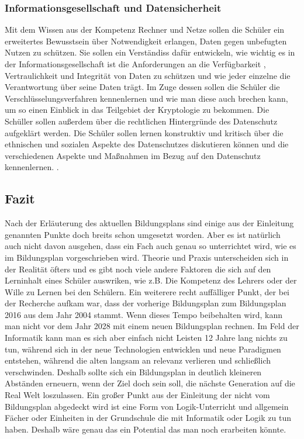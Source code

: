 \subsubsection{Informationsgesellschaft und Datensicherheit}

Mit dem Wissen aus der Kompetenz Rechner und Netze sollen die Schüler ein erweitertes Bewusstsein über Notwendigkeit erlangen, Daten gegen unbefugten Nutzen zu schützen. Sie sollen ein Verständiss dafür entwickeln, wie wichtig es in der Informationsgesellschaft ist die Anforderungen an die Verfügbarkeit , Vertraulichkeit und Integrität von Daten zu schützen und wie jeder einzelne die Verantwortung über seine Daten trägt. Im Zuge dessen sollen die Schüler die Verschlüsselungsverfahren kennenlernen und wie man diese auch brechen kann, um so einen Einblick in das Teilgebiet der Kryptologie zu bekommen. Die Schüller sollen außerdem über die rechtlichen Hintergründe des Datenschutz aufgeklärt werden. Die Schüler sollen lernen konstruktiv und kritisch über die ethnischen und sozialen Aspekte des Datenschutzes diskutieren können und die verschiedenen Aspekte und Maßnahmen im Bezug auf den Datenschutz kennenlernen.
\cite{InfoGes}.

\subsection{Fazit}
Nach der Erläuterung des aktuellen Bildungsplans sind einige aus der Einleitung genannten Punkte doch breits schon umgesetzt worden. Aber es ist natürlich auch nicht davon ausgehen, dass ein Fach auch genau so unterrichtet wird, wie es im Bildungsplan vorgeschrieben wird. Theorie und Praxis unterscheiden sich in der Realität öfters und es gibt noch viele andere Faktoren die sich auf den Lerninhalt eines Schüler auswriken, wie z.B. Die Kompetenz des Lehrers oder der Wille zu Lernen bei den Schülern. Ein weiterere recht auffälliger Punkt, der bei der Recherche aufkam war, dass der vorherige Bildungsplan zum Bildungsplan 2016 aus dem Jahr 2004 stammt. Wenn dieses Tempo beibehalten wird, kann man nicht vor dem Jahr 2028 mit einem neuen Bildungsplan rechnen. Im Feld der Informatik kann man es sich aber einfach nicht Leisten 12 Jahre lang nichts zu tun, während sich in der neue Technologien entwicklen und neue Paradigmen entstehen, während die alten langsam an relevanz verlieren und schließlich verschwinden. Deshalb sollte sich ein Bildungsplan in deutlich kleineren Abständen erneuern, wenn der Ziel doch sein soll, die nächste Generation auf die Real Welt loszulassen. Ein großer Punkt aus der Einleitung der nicht vom Bildungsplan abgedeckt wird ist eine Form von Logik-Unterricht und allgemein Fächer oder Einheiten in der Grundschule die mit Informatik oder Logik zu tun haben. Deshalb wäre genau das ein Potential das man noch erarbeiten könnte.

